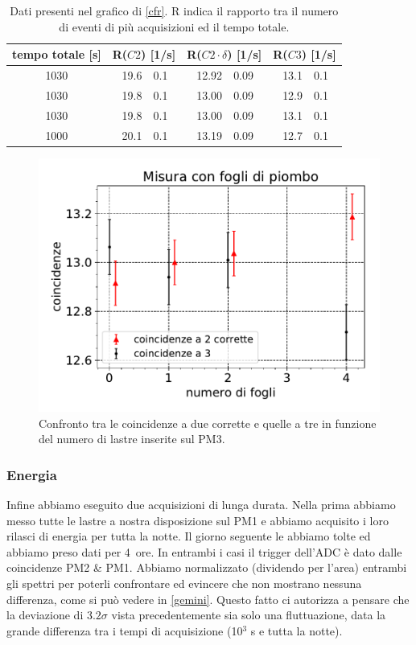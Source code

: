 \begin{table}[h]
\centering
\begin{tabular}{| c | r @{$\pm$} l | r @{$\pm$} l | r @{$\pm$} l |}
\hline
tempo totale [\si{s}] & \multicolumn{2}{c|}{R($C2$) [1/\si{s}]} & \multicolumn{2}{c|}{R($C2\cdot \delta$) [1/\si{s}]} & \multicolumn{2}{c|}{R($C3$) [1/\si{s}]} \\
\hline
1030 & 19.6&0.1 & 12.92&0.09 & 13.1&0.1 \\
1030 & 19.8&0.1 & 13.00&0.09 & 12.9&0.1 \\
1030 & 19.8&0.1 & 13.00&0.09 & 13.1&0.1 \\
1000 & 20.1&0.1 & 13.19&0.09 & 12.7&0.1 \\
\hline
\end{tabular}
\caption{Dati presenti nel grafico di \autoref{cfr}. R indica il rapporto tra il numero di eventi di più acquisizioni ed il tempo totale.}
\label{dati cfr}
\end{table}


\begin{figure}[h]
\centering
\includegraphics[width=8 cm]{confronto}
\caption{Confronto tra le coincidenze a due corrette e quelle a tre in funzione del numero di lastre inserite sul PM3.}
\label{cfr}
\end{figure}

\subsubsection{Energia}

\label{sez}
Infine abbiamo eseguito due acquisizioni di lunga durata. Nella prima abbiamo messo tutte le lastre a nostra disposizione sul PM1 e abbiamo acquisito i loro rilasci di energia per tutta la notte. Il giorno seguente le abbiamo tolte ed abbiamo preso dati per \SI{4}{ore}. In entrambi i casi il trigger dell'ADC è dato dalle coincidenze PM2 \& PM1.  Abbiamo normalizzato (dividendo per l'area) entrambi gli spettri per poterli confrontare ed evincere che non mostrano nessuna differenza, come si può vedere in \autoref{gemini}. Questo fatto ci autorizza a pensare che la deviazione di $3.2\sigma$ vista precedentemente sia solo una fluttuazione, data la grande differenza tra i tempi di acquisizione (10$^3$\! s e tutta la notte). 

